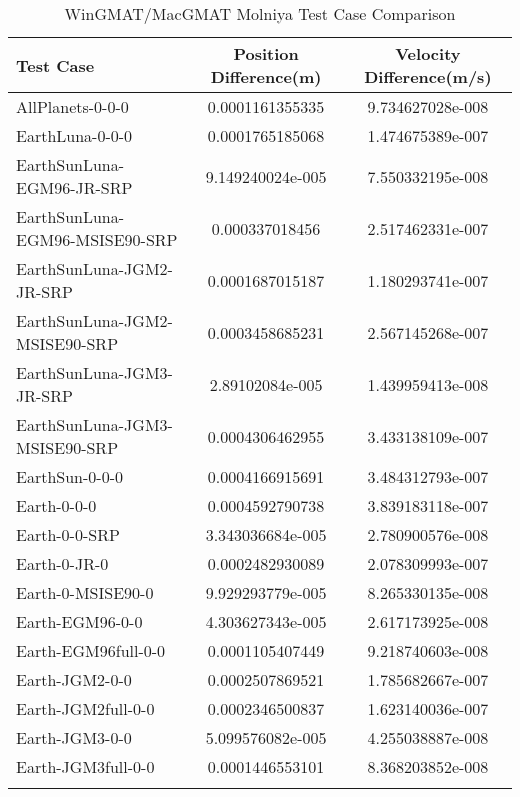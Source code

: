 \begin{table}[htbp!]
\centering
\caption{ WinGMAT/MacGMAT Molniya Test Case Comparison}
      \begin{tabular}{lcc}
      \hline\hline
          Test Case & Position Difference(m) & Velocity Difference(m/s) \\
         \hline
         AllPlanets-0-0-0 & 0.0001161355335 & 9.734627028e-008 \\
         EarthLuna-0-0-0 & 0.0001765185068 & 1.474675389e-007 \\
         EarthSunLuna-EGM96-JR-SRP & 9.149240024e-005 & 7.550332195e-008 \\
         EarthSunLuna-EGM96-MSISE90-SRP & 0.000337018456 & 2.517462331e-007 \\
         EarthSunLuna-JGM2-JR-SRP & 0.0001687015187 & 1.180293741e-007 \\
         EarthSunLuna-JGM2-MSISE90-SRP & 0.0003458685231 & 2.567145268e-007 \\
         EarthSunLuna-JGM3-JR-SRP & 2.89102084e-005 & 1.439959413e-008 \\
         EarthSunLuna-JGM3-MSISE90-SRP & 0.0004306462955 & 3.433138109e-007 \\
         EarthSun-0-0-0 & 0.0004166915691 & 3.484312793e-007 \\
         Earth-0-0-0 & 0.0004592790738 & 3.839183118e-007 \\
         Earth-0-0-SRP & 3.343036684e-005 & 2.780900576e-008 \\
         Earth-0-JR-0 & 0.0002482930089 & 2.078309993e-007 \\
         Earth-0-MSISE90-0 & 9.929293779e-005 & 8.265330135e-008 \\
         Earth-EGM96-0-0 & 4.303627343e-005 & 2.617173925e-008 \\
         Earth-EGM96full-0-0 & 0.0001105407449 & 9.218740603e-008 \\
         Earth-JGM2-0-0 & 0.0002507869521 & 1.785682667e-007 \\
         Earth-JGM2full-0-0 & 0.0002346500837 & 1.623140036e-007 \\
         Earth-JGM3-0-0 & 5.099576082e-005 & 4.255038887e-008 \\
         Earth-JGM3full-0-0 & 0.0001446553101 & 8.368203852e-008 \\
      \hline\hline
      \label{Table: Molniya WinGMAT-MacGMAT Table} 
\end{tabular}
\end{table}
